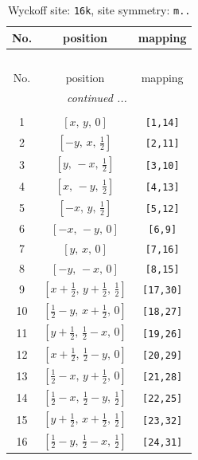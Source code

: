 \documentclass[fleqn,8pt]{jsarticle}
\begin{document}
\renewcommand{\arraystretch}{1.2}
\begin{longtable}{ccc}
\caption{Wyckoff site: {\tt 16k}, site symmetry: {\tt m..}}
 \\
 \hline \hline
No. & position & mapping \\ \hline \endfirsthead

\multicolumn{2}{l}{\tablename\ \thetable{}} \\
 \hline \hline
No. & position & mapping \\ \hline \endhead

 \hline \hline
\multicolumn{2}{r}{\footnotesize\it continued ...} \\ \endfoot

 \hline \hline
\multicolumn{2}{r}{} \\ \endlastfoot

1 & $\left[ x,\, y,\, 0 \right]$ & {\tt [1,14]} \\ \hline
2 & $\left[ - y,\, x,\, \frac{1}{2} \right]$ & {\tt [2,11]} \\ \hline
3 & $\left[ y,\, - x,\, \frac{1}{2} \right]$ & {\tt [3,10]} \\ \hline
4 & $\left[ x,\, - y,\, \frac{1}{2} \right]$ & {\tt [4,13]} \\ \hline
5 & $\left[ - x,\, y,\, \frac{1}{2} \right]$ & {\tt [5,12]} \\ \hline
6 & $\left[ - x,\, - y,\, 0 \right]$ & {\tt [6,9]} \\ \hline
7 & $\left[ y,\, x,\, 0 \right]$ & {\tt [7,16]} \\ \hline
8 & $\left[ - y,\, - x,\, 0 \right]$ & {\tt [8,15]} \\ \hline
9 & $\left[ x + \frac{1}{2},\, y + \frac{1}{2},\, \frac{1}{2} \right]$ & {\tt [17,30]} \\ \hline
10 & $\left[ \frac{1}{2} - y,\, x + \frac{1}{2},\, 0 \right]$ & {\tt [18,27]} \\ \hline
11 & $\left[ y + \frac{1}{2},\, \frac{1}{2} - x,\, 0 \right]$ & {\tt [19,26]} \\ \hline
12 & $\left[ x + \frac{1}{2},\, \frac{1}{2} - y,\, 0 \right]$ & {\tt [20,29]} \\ \hline
13 & $\left[ \frac{1}{2} - x,\, y + \frac{1}{2},\, 0 \right]$ & {\tt [21,28]} \\ \hline
14 & $\left[ \frac{1}{2} - x,\, \frac{1}{2} - y,\, \frac{1}{2} \right]$ & {\tt [22,25]} \\ \hline
15 & $\left[ y + \frac{1}{2},\, x + \frac{1}{2},\, \frac{1}{2} \right]$ & {\tt [23,32]} \\ \hline
16 & $\left[ \frac{1}{2} - y,\, \frac{1}{2} - x,\, \frac{1}{2} \right]$ & {\tt [24,31]} \\
\end{longtable}
\end{document}
